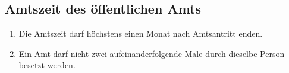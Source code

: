 \documentclass{article}
\begin{document}
\subsection{Amtszeit des öffentlichen Amts}
\begin{enumerate}
    \item Die Amtszeit darf höchstens einen Monat nach Amtsantritt enden.
    \item Ein Amt darf nicht zwei aufeinanderfolgende Male durch dieselbe Person besetzt werden.
\end{enumerate}
\end{document}
